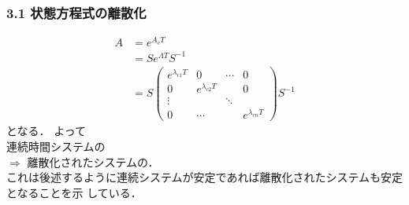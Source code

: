 \begin{frame}[t]
\frametitle{3.1 状態方程式の離散化}
\begin{align}
 A &=  e^{A_cT} \nonumber \\
 &= S e^{\Lambda T} S^{-1} \nonumber \\
 &=
  S \left(\begin{array}{cccc}
           e^{\lambda_{c1} T} & 0                  & \cdots & 0 \\
	   0                  & e^{\lambda_{c2} T} &        & 0 \\
	   \vdots             &                    & \ddots & \\
	   0                  & \cdots             & & e^{\lambda_{cn} T}
	  \end{array}\right)
  S^{-1} \tag{3.7}
\end{align}
となる．
よって\\
\hspace*{0.5cm}
連続時間システムの\\
\hspace*{0.5cm}
$\Longrightarrow$ 離散化されたシステムの．\\
これは後述するように連続システムが安定であれば離散化されたシステムも安定となることを示
している．
\end{frame}

